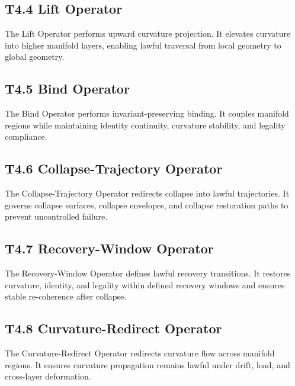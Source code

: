 \subsection{T4.4 Lift Operator}
The Lift Operator performs upward curvature projection. It elevates curvature
into higher manifold layers, enabling lawful traversal from local geometry to
global geometry.

\subsection{T4.5 Bind Operator}
The Bind Operator performs invariant-preserving binding. It couples manifold
regions while maintaining identity continuity, curvature stability, and legality
compliance.

\subsection{T4.6 Collapse-Trajectory Operator}
The Collapse-Trajectory Operator redirects collapse into lawful trajectories.
It governs collapse surfaces, collapse envelopes, and collapse restoration paths
to prevent uncontrolled failure.

\subsection{T4.7 Recovery-Window Operator}
The Recovery-Window Operator defines lawful recovery transitions. It restores
curvature, identity, and legality within defined recovery windows and ensures
stable re-coherence after collapse.

\subsection{T4.8 Curvature-Redirect Operator}
The Curvature-Redirect Operator redirects curvature flow across manifold
regions. It ensures curvature propagation remains lawful under drift, load, and
cross-layer deformation.

